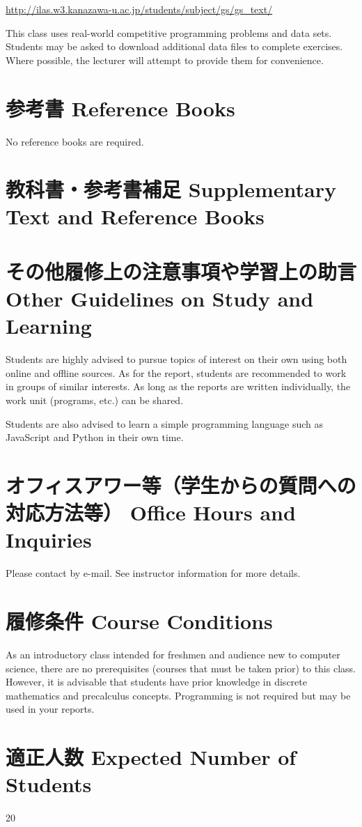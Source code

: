 \documentclass{article}
\begin{document}
\url{http://ilas.w3.kanazawa-u.ac.jp/students/subject/gs/gs_text/}

This class uses real-world competitive programming problems and data sets. Students may be asked to download additional data files to complete exercises. Where possible, the lecturer will attempt to provide them for convenience.

\section{参考書 Reference Books}
No reference books are required.

\section{教科書・参考書補足 Supplementary Text and Reference Books}

\section{その他履修上の注意事項や学習上の助言 Other Guidelines on Study and Learning}
Students are highly advised to pursue topics of interest on their own using both online and offline sources. As for the report, students are recommended to work in groups of similar interests. As long as the reports are written individually, the work unit (programs, etc.) can be shared.

Students are also advised to learn a simple programming language such as JavaScript and Python in their own time.

\section{オフィスアワー等（学生からの質問への対応方法等） Office Hours and Inquiries}
Please contact by e-mail. See instructor information for more details.

\section{履修条件 Course Conditions}
As an introductory class intended for freshmen and audience new to computer science, there are no prerequisites (courses that must be taken prior) to this class. However, it is advisable that students have prior knowledge in discrete mathematics and precalculus concepts. Programming is not required but may be used in your reports.

\section{適正人数 Expected Number of Students}
20
\end{document}
